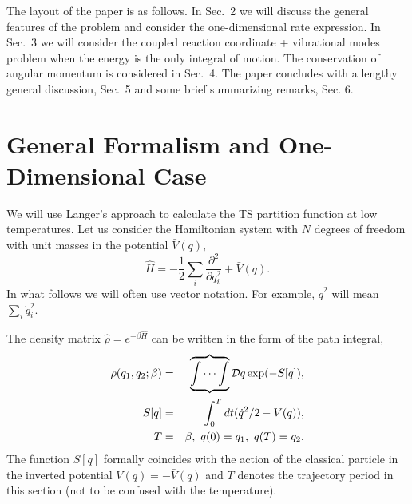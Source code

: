 \documentclass[journal=jpcafh,manuscript=article]{achemso}
\begin{document}
The layout of the paper is as follows. In Sec.~2 we will discuss the
general features of the problem and consider the one-dimensional rate
expression. In Sec.~3 we will consider the coupled reaction
coordinate + vibrational modes problem when the energy is the only
integral of motion. The conservation of angular momentum is
considered in Sec.~4. The paper concludes with a lengthy general
discussion, Sec.~5 and some brief summarizing remarks, Sec. 6.

\setcounter{equation}{0}
\section{General Formalism and One-Dimensional Case}
We will use Langer's approach\cite{langer67} to calculate the
TS partition function at low temperatures.  Let us
consider the Hamiltonian system with $N$ degrees of freedom with
unit masses in the potential $\bar{V}(q)$,
\begin{equation}
  \label{main_ham}
  \hat{H} = -\frac{1}{2}\sum_i\frac{\partial^2}{\partial q_i^2}+\bar{V}(q).
\end{equation}
In what follows we will often use vector notation. For example,
$\dot{q}^2$ will mean $\sum_i\dot{q}_i^2$.

The density matrix $\hat{\rho} = e^{-\beta\hat{H}}$ can be written in
the form of the path integral,\cite{feynman72}
\begin{eqnarray}
  \label{dm_pi}
  \rho(q_1, q_2; \beta) &=& \overbrace{\underbrace{\int\cdots\int}}\mathcal{D} q\exp(-S[q]),
  \\
  \label{tun_act}
  S[q]  &=& \int_0^T dt(\dot{q}^2/2 - V(q)),
  \\
  \nonumber
  T&=&\beta,\ q(0)=q_1,\ q(T)=q_2.
\end{eqnarray}
The function $S[q]$ formally coincides with the action of the
classical particle in the inverted potential $V(q)=-\bar{V}(q)$ and
$T$ denotes the trajectory period in this section (not to be confused
with the temperature).
\end{document}

